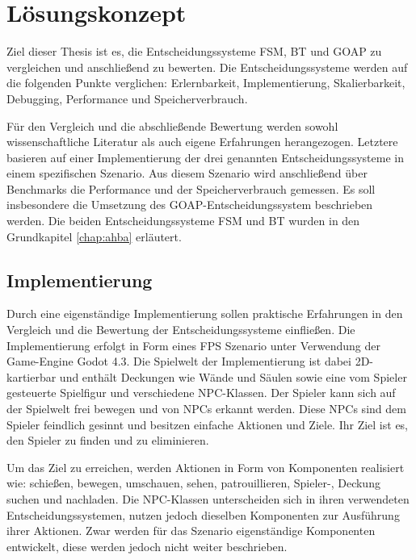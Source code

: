 \chapter{L\"{o}sungskonzept}
\label{chap:loesungskonzept}

Ziel dieser Thesis ist es, die Entscheidungssysteme FSM, BT und GOAP zu vergleichen und anschlie\ss{}end zu bewerten. Die Entscheidungssysteme werden auf die folgenden Punkte verglichen: Erlernbarkeit, Implementierung, Skalierbarkeit, Debugging, Performance und Speicherverbrauch.

F\"{u}r den Vergleich und die abschlie\ss{}ende Bewertung werden sowohl wissenschaftliche Literatur als auch eigene Erfahrungen herangezogen. Letztere basieren auf einer Implementierung der drei genannten Entscheidungssysteme in einem spezifischen Szenario. Aus diesem Szenario wird anschlie\ss{}end \"{u}ber Benchmarks die Performance und der Speicherverbrauch gemessen. Es soll insbesondere die Umsetzung des GOAP-Entscheidungssystem beschrieben werden. Die beiden Entscheidungssysteme FSM und BT wurden in den Grundkapitel \ref{chap:ahba} erl\"{a}utert.

\section{Implementierung}
\label{chap:lk implementierung}

Durch eine eigenst\"{a}ndige Implementierung sollen praktische Erfahrungen in den Vergleich und die Bewertung der Entscheidungssysteme einflie\ss{}en. Die Implementierung erfolgt in Form eines FPS Szenario unter Verwendung der Game-Engine Godot 4.3. Die Spielwelt der Implementierung ist dabei 2D-kartierbar und enth\"{a}lt Deckungen wie W\"{a}nde und S\"{a}ulen sowie eine vom Spieler gesteuerte Spielfigur und verschiedene NPC-Klassen. Der Spieler kann sich auf der Spielwelt frei bewegen und von NPCs erkannt werden. Diese NPCs sind dem Spieler feindlich gesinnt und besitzen einfache Aktionen und Ziele. Ihr Ziel ist es, den Spieler zu finden und zu eliminieren.

Um das Ziel zu erreichen, werden Aktionen in Form von Komponenten realisiert wie: schie\ss{}en, bewegen, umschauen, sehen, patrouillieren, Spieler-, Deckung suchen und nachladen. Die NPC-Klassen unterscheiden sich in ihren verwendeten Entscheidungssystemen, nutzen jedoch dieselben Komponenten zur Ausf\"{u}hrung ihrer Aktionen. Zwar werden f\"{u}r das Szenario eigenst\"{a}ndige Komponenten entwickelt, diese werden jedoch nicht weiter beschrieben.

